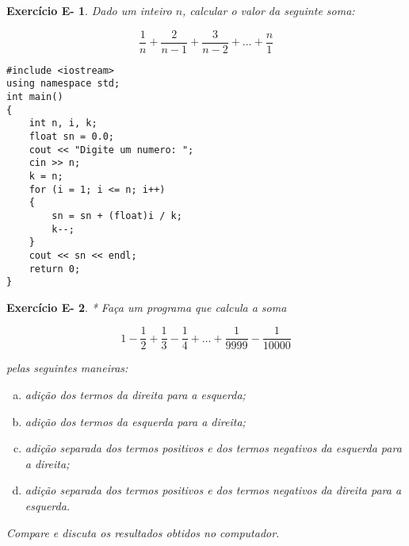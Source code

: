 \documentclass[a4paper]{article}
\newtheorem{eex}{Exerc\'icio E-}
\begin{document}
\newpage 

\begin{eex}
Dado um inteiro $n$, calcular o valor da seguinte soma:

\[
\frac{1}{n} + \frac{2}{n-1} + \frac{3}{n-2} + \ldots + \frac{n}{1}
\]
\end{eex}

\begin{sol}
\begin{lstlisting}
#include <iostream>
using namespace std;
int main()
{
    int n, i, k;
    float sn = 0.0;
    cout << "Digite um numero: ";
    cin >> n;
    k = n;
    for (i = 1; i <= n; i++)
    {
        sn = sn + (float)i / k;
        k--;
    }
    cout << sn << endl;
    return 0;
}
\end{lstlisting}
\end{sol}

\begin{eex}
* Faça um programa que calcula a soma

\[
1 - \frac{1}{2} + \frac{1}{3} - \frac{1}{4} + \ldots + \frac{1}{9999} - \frac{1}{10000}
\]

pelas seguintes maneiras:

\begin{enumerate}[a)]
 \item adição dos termos da direita para a esquerda;
 \item adição dos termos da esquerda para a direita;
 \item adição separada dos termos positivos e dos termos negativos da esquerda para a direita;
 \item adição separada dos termos positivos e dos termos negativos da direita para a esquerda.
\end{enumerate}

Compare e discuta os resultados obtidos no computador.
\end{eex}
\end{document}

